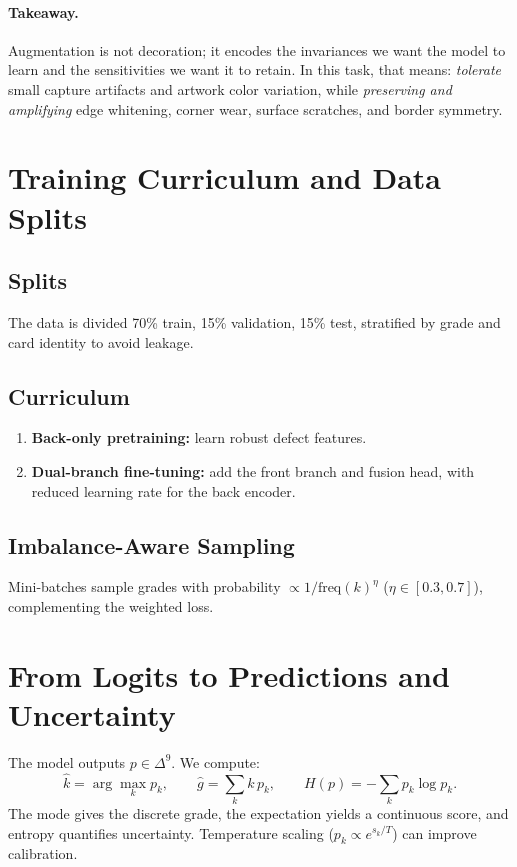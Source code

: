 \documentclass[12pt]{article}
\begin{document}
\paragraph{Takeaway.}
Augmentation is not decoration; it encodes the invariances we want the model to learn and the sensitivities we want it to retain. 
In this task, that means: \emph{tolerate} small capture artifacts and artwork color variation, while \emph{preserving and amplifying} edge whitening, corner wear, surface scratches, and border symmetry.


\section{Training Curriculum and Data Splits}
\subsection{Splits}
The data is divided 70\% train, 15\% validation, 15\% test, stratified by grade and card identity to avoid leakage.

\subsection{Curriculum}
\begin{enumerate}
    \item \textbf{Back-only pretraining:} learn robust defect features.
    \item \textbf{Dual-branch fine-tuning:} add the front branch and fusion head, with reduced learning rate for the back encoder.
\end{enumerate}

\subsection{Imbalance-Aware Sampling}
Mini-batches sample grades with probability $\propto 1/\text{freq}(k)^\eta$ ($\eta\in[0.3,0.7]$), complementing the weighted loss.

\section{From Logits to Predictions and Uncertainty}
The model outputs $p\in\Delta^9$. 
We compute:
\[
\hat{k} = \arg\max_k p_k,\qquad 
\hat{g} = \sum_k k\,p_k,\qquad 
H(p) = -\sum_k p_k\log p_k.
\]
The mode gives the discrete grade, the expectation yields a continuous score, and entropy quantifies uncertainty.
Temperature scaling ($p_k \propto e^{s_k/T}$) can improve calibration.
\end{document}
